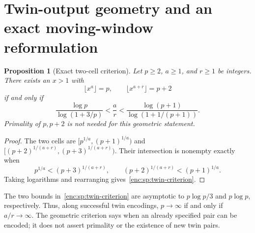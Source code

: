 \documentclass[11pt,a4paper]{article}
\newtheorem{proposition}[theorem]{Proposition}
\theoremstyle{definition}
\theoremstyle{remark}
\numberwithin{equation}{section}
\begin{document}
\section{Twin-output geometry and an exact moving-window reformulation}
\label{enc:sp:twins}

\begin{proposition}[Exact two-cell criterion]\label{enc:sp:twin-cell}
Let $p\ge2$, $a\ge1$, and $r\ge1$ be integers. There exists an $x>1$ with
\[
 \lfloor x^a\rfloor=p,\qquad \lfloor x^{a+r}\rfloor=p+2
\]
if and only if
\begin{equation}\label{enc:sp:twin-criterion}
 \frac{\log p}{\log(1+3/p)}
 <\frac a r<
 \frac{\log(p+1)}{\log(1+1/(p+1))}.
\end{equation}
Primality of $p,p+2$ is not needed for this geometric statement.
\end{proposition}
\begin{proof}
The two cells are
$[p^{1/a},(p+1)^{1/a})$ and
$[(p+2)^{1/(a+r)},(p+3)^{1/(a+r)})$.
Their intersection is nonempty exactly when
\[
 p^{1/a}<(p+3)^{1/(a+r)},\qquad
 (p+2)^{1/(a+r)}<(p+1)^{1/a}.
\]
Taking logarithms and rearranging gives~\eqref{enc:sp:twin-criterion}.
\end{proof}

The two bounds in~\eqref{enc:sp:twin-criterion} are asymptotic to
$p\log p/3$ and $p\log p$, respectively. Thus, along successful twin
encodings, $p\to\infty$ if and only if $a/r\to\infty$. The geometric
criterion says when an already specified pair can be encoded; it does
not assert primality or the existence of new twin pairs.
\end{document}
